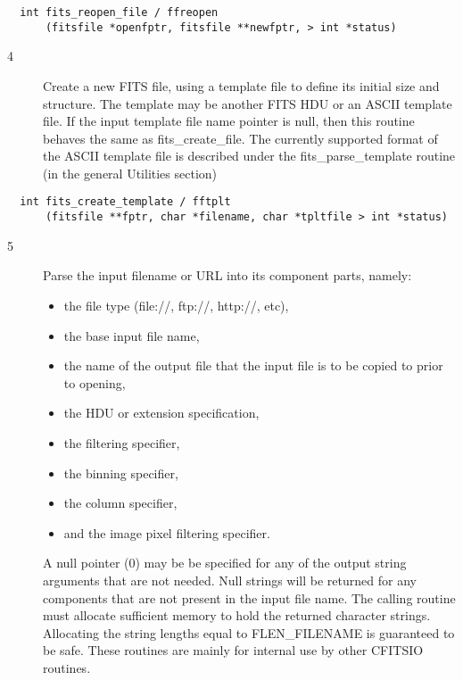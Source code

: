 \documentclass[11pt]{book}
\begin{document}
\begin{verbatim}
  int fits_reopen_file / ffreopen
      (fitsfile *openfptr, fitsfile **newfptr, > int *status)
\end{verbatim}


\begin{description}
\item[4 ]  Create a new FITS file, using a template file to define its
  initial size and structure.  The template may be another FITS HDU
  or an ASCII template file.  If the input template file name pointer
  is null, then this routine behaves the same as fits\_create\_file.
  The currently supported format of the ASCII template file is described
  under the fits\_parse\_template routine (in the general Utilities
  section)
\label{fftplt}
\end{description}

\begin{verbatim}
  int fits_create_template / fftplt
      (fitsfile **fptr, char *filename, char *tpltfile > int *status)
\end{verbatim}


\begin{description}
\item[5 ] Parse the input filename or URL into its component parts, namely:
\begin{itemize}
\item
the file type (file://, ftp://, http://, etc),
\item
the base input file name,
\item
the name of the output file that the input file is to be copied to prior
to opening,
\item
the HDU or extension specification,
\item
the filtering specifier,
\item
the binning specifier,
\item
the column specifier,
\item
and the
image pixel filtering specifier.
\end{itemize}
A null pointer (0) may be be specified for any of the output string arguments
that are not needed.  Null strings will be returned for any components that are not
present in the input file name.  The calling routine must allocate sufficient
memory to hold the returned character strings.  Allocating the string lengths
equal to FLEN\_FILENAME is guaranteed to be safe.
These routines are mainly for internal use
by other CFITSIO routines. \label{ffiurl}
\end{description}
\end{document}
